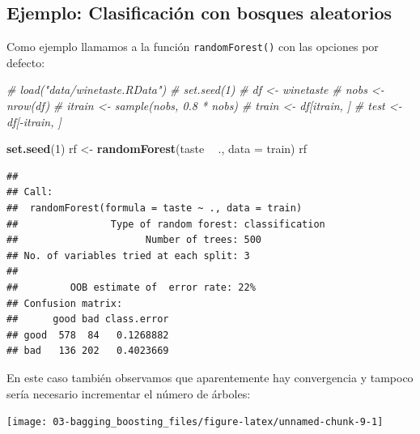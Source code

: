 \documentclass[]{book}
\newenvironment{Shaded}{\begin{snugshade}}{\end{snugshade}}
\newcommand{\KeywordTok}[1]{\textcolor[rgb]{0.13,0.29,0.53}{\textbf{#1}}}
\newcommand{\DataTypeTok}[1]{\textcolor[rgb]{0.13,0.29,0.53}{#1}}
\newcommand{\DecValTok}[1]{\textcolor[rgb]{0.00,0.00,0.81}{#1}}
\newcommand{\StringTok}[1]{\textcolor[rgb]{0.31,0.60,0.02}{#1}}
\newcommand{\CommentTok}[1]{\textcolor[rgb]{0.56,0.35,0.01}{\textit{#1}}}
\newcommand{\OperatorTok}[1]{\textcolor[rgb]{0.81,0.36,0.00}{\textbf{#1}}}
\newcommand{\NormalTok}[1]{#1}
\theoremstyle{break}
\theoremstyle{definition}
\theoremstyle{definition}
\theoremstyle{definition}
\theoremstyle{remark}
\begin{document}
\subsection{Ejemplo: Clasificación con bosques
aleatorios}\label{ejemplo-clasificaciuxf3n-con-bosques-aleatorios}

Como ejemplo llamamos a la función \texttt{randomForest()} con las
opciones por defecto:

\begin{Shaded}
\begin{Highlighting}[]
\CommentTok{# load("data/winetaste.RData")}
\CommentTok{# set.seed(1)}
\CommentTok{# df <- winetaste}
\CommentTok{# nobs <- nrow(df)}
\CommentTok{# itrain <- sample(nobs, 0.8 * nobs)}
\CommentTok{# train <- df[itrain, ]}
\CommentTok{# test <- df[-itrain, ]}

\KeywordTok{set.seed}\NormalTok{(}\DecValTok{1}\NormalTok{)}
\NormalTok{rf <-}\StringTok{ }\KeywordTok{randomForest}\NormalTok{(taste }\OperatorTok{~}\StringTok{ }\NormalTok{., }\DataTypeTok{data =}\NormalTok{ train)}
\NormalTok{rf}
\end{Highlighting}
\end{Shaded}

\begin{verbatim}
## 
## Call:
##  randomForest(formula = taste ~ ., data = train) 
##                Type of random forest: classification
##                      Number of trees: 500
## No. of variables tried at each split: 3
## 
##         OOB estimate of  error rate: 22%
## Confusion matrix:
##      good bad class.error
## good  578  84   0.1268882
## bad   136 202   0.4023669
\end{verbatim}

En este caso también observamos que aparentemente hay convergencia y
tampoco sería necesario incrementar el número de árboles:

\begin{Shaded}
\end{Shaded}

\begin{center}\texttt{[image: 03-bagging\_boosting\_files/figure-latex/unnamed-chunk-9-1]} \end{center}
\end{document}
